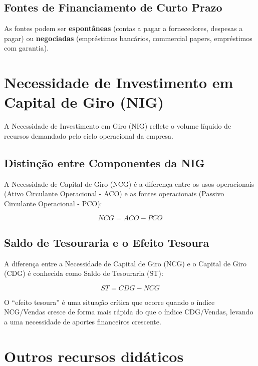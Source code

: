 \documentclass[
  a4paper,
]{book}
\begin{document}
\subsection{Fontes de Financiamento de Curto
Prazo}\label{fontes-de-financiamento-de-curto-prazo}

As fontes podem ser \textbf{espontâneas} (contas a pagar a fornecedores,
despesas a pagar) ou \textbf{negociadas} (empréstimos bancários,
commercial papers, empréstimos com garantia).

\section{Necessidade de Investimento em Capital de Giro
(NIG)}\label{necessidade-de-investimento-em-capital-de-giro-nig}

A Necessidade de Investimento em Giro (NIG) reflete o volume líquido de
recursos demandado pelo ciclo operacional da empresa.

\subsection{Distinção entre Componentes da
NIG}\label{distinuxe7uxe3o-entre-componentes-da-nig}

A Necessidade de Capital de Giro (NCG) é a diferença entre os usos
operacionais (Ativo Circulante Operacional - ACO) e as fontes
operacionais (Passivo Circulante Operacional - PCO):

\[NCG = ACO - PCO\]

\subsection{Saldo de Tesouraria e o Efeito
Tesoura}\label{saldo-de-tesouraria-e-o-efeito-tesoura}

A diferença entre a Necessidade de Capital de Giro (NCG) e o Capital de
Giro (CDG) é conhecida como Saldo de Tesouraria (ST):

\[ST = CDG - NCG\]

O ``efeito tesoura'' é uma situação crítica que ocorre quando o índice
NCG/Vendas cresce de forma mais rápida do que o índice CDG/Vendas,
levando a uma necessidade de aportes financeiros crescente.

\section*{Outros recursos
didáticos}\label{outros-recursos-diduxe1ticos-1}
\end{document}
